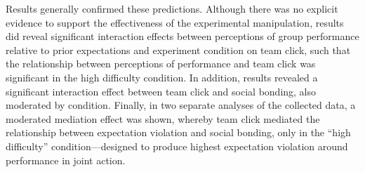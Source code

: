 Results generally confirmed these predictions.  Although there was no explicit evidence to support the effectiveness of the experimental manipulation, results did reveal significant interaction effects between perceptions of group performance relative to prior expectations and experiment condition on team click, such that the relationship between perceptions of performance and team click was significant in the high difficulty condition.  In addition, results revealed a significant interaction effect between team click and social bonding, also moderated by condition. Finally, in two separate analyses of the collected data, a moderated mediation effect was shown, whereby team click mediated the relationship between expectation violation and social bonding, only in the ``high difficulty'' condition---designed to produce highest expectation violation around performance in joint action.
